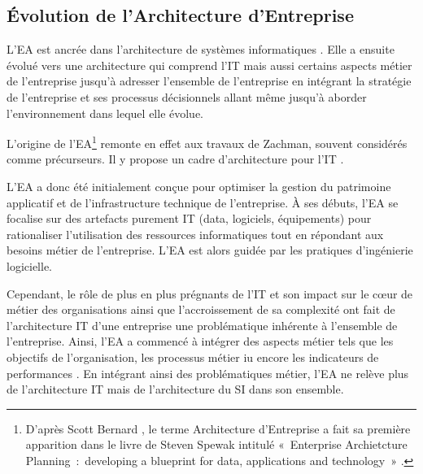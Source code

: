 
	\subsection{Évolution de l'Architecture d'Entreprise}

L'EA est ancrée dans l'architecture de systèmes 
informatiques \cite{kappelman2008enterprise}. Elle a ensuite évolué vers une 
architecture qui comprend l'IT mais aussi certains aspects métier de l'entreprise 
\cite{winter2006essential}  jusqu'à adresser l'ensemble de l'entreprise en 
intégrant la stratégie de l'entreprise et ses processus décisionnels 
\cite{ross2006enterprise} allant même jusqu'à aborder l'environnement dans 
lequel elle évolue.

L'origine de l'EA\footnote{D'après Scott Bernard 
\cite{bernard2012introduction}, le terme Architecture d'Entreprise a fait sa 
première apparition dans le livre de Steven Spewak intitulé «~Enterprise 
Archietcture Planning~:~developing a blueprint for data, applications and 
technology~» \cite{spewak1993enterprise}.} remonte en effet aux travaux de Zachman, souvent considérés comme précurseurs. Il y propose un cadre d'architecture pour l'IT \cite{zachman1987framework}.

L'EA a donc été initialement conçue pour optimiser la gestion du patrimoine applicatif et de l'infrastructure technique de l'entreprise. À ses débuts, l'EA se focalise sur des artefacts purement IT (data, logiciels, équipements) pour 
rationaliser l'utilisation des ressources informatiques 
\cite{winter2006essential} tout en répondant aux besoins métier de l'entreprise. 
L'EA est alors guidée par les pratiques d'ingénierie logicielle. 

Cependant, le rôle de plus en plus prégnants de l'IT et son impact sur le 
cœur de métier des organisations ainsi que l'accroissement de sa complexité 
\cite{ranganathan2005enterprise} ont fait de l'architecture IT d'une 
entreprise une problématique inhérente à l'ensemble de 
l'entreprise. Ainsi, l'EA a commencé à intégrer des aspects métier tels que les 
objectifs de l'organisation, les processus métier iu encore les indicateurs de 
performances \cite{winter2006essential}. En intégrant ainsi des problématiques 
métier, l'EA ne relève plus de l'architecture IT mais de l'architecture du SI 
dans son ensemble.

